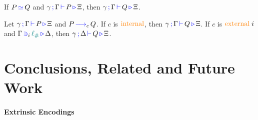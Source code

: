 \documentclass[runningheads]{llncs}
\newcommand{\type}[1]{\textcolor{blue}{\operatorname{#1}}}
\newcommand{\constr}[1]{\textcolor{orange}{\operatorname{#1}}}
\newcommand{\func}[1]{\textcolor{teal}{\operatorname{#1}}}
\newcommand{\lio}{\func{\ell_{\#}}}
\newcommand{\reduce}[1]{\, \type{\longrightarrow}_{#1} \,}
\newcommand{\types}[4]{#1 \, \type{;} \, #2 \, \type{\vdash} \, #3 \, \type{\triangleright} \, #4}
\newcommand{\containsusage}[4]{#1 \, \type{\ni}_{#2} \, #3 \, \type{\triangleright} \, #4}
\newcommand{\eq}{\, \type{\simeq} \,}
\begin{document}
\begin{nitheorem}
  \label{thm:subject-congruence}
  If $P \eq{} Q$ and $\types{\gamma}{\Gamma}{P}{\Xi}$, then $\types{\gamma}{\Gamma}{Q}{\Xi}$.
\end{nitheorem}

\begin{nitheorem}
  \label{thm:subject-reduction}
  Let $\types{\gamma}{\Gamma}{P}{\Xi}$ and $P \reduce{c} Q$.
  If $c$ is $\constr{internal}$, then $\types{\gamma}{\Gamma}{Q}{\Xi}$.
  If $c$ is $\constr{external} \; i$ and $\containsusage{\Gamma}{i}{\lio}{\Delta}$, then $\types{\gamma}{\Delta}{Q}{\Xi}$.
\end{nitheorem}

\section{Conclusions, Related and Future Work}

\paragraph*{Extrinsic Encodings}
\end{document}
